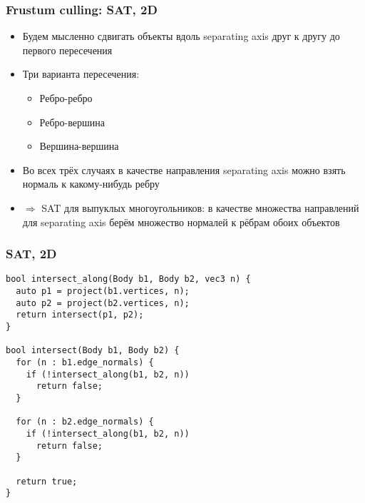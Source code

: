 \documentclass{beamer}
\begin{document}
\begin{frame}[fragile]
\frametitle{Frustum culling: SAT, 2D}
\begin{itemize}
\item Будем мысленно сдвигать объекты вдоль separating axis друг к другу до первого пересечения
\pause
\item Три варианта пересечения:
\begin{itemize}
\item Ребро-ребро
\item Ребро-вершина
\item Вершина-вершина
\end{itemize}
\pause
\item Во всех трёх случаях в качестве направления separating axis можно взять нормаль к какому-нибудь ребру
\pause
\item \begin{math}\Longrightarrow\end{math} SAT для выпуклых многоугольников: в качестве множества направлений для separating axis берём множество нормалей к рёбрам обоих объектов
\end{itemize}
\end{frame}

\begin{frame}[fragile]
\frametitle{SAT, 2D}
\begin{verbatim}
bool intersect_along(Body b1, Body b2, vec3 n) {
  auto p1 = project(b1.vertices, n);
  auto p2 = project(b2.vertices, n);
  return intersect(p1, p2);
}

bool intersect(Body b1, Body b2) {
  for (n : b1.edge_normals) {
    if (!intersect_along(b1, b2, n))
      return false;
  }

  for (n : b2.edge_normals) {
    if (!intersect_along(b1, b2, n))
      return false;
  }

  return true;
}
\end{verbatim}
\end{frame}
\end{document}
